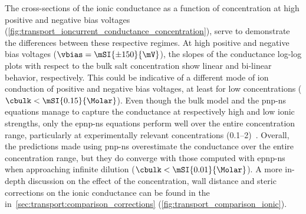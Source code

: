 The cross-sections of the ionic conductance as a function of concentration at high positive and negative bias
voltages (\cref{fig:transport_ioncurrent_conductance_concentration}), serve to demonstrate the differences
between these respective regimes. At high positive and negative bias voltages ($\vbias=\mSI{\pm150}{\mV}$),
the slopes of the conductance log-log plots with respect to the bulk salt concentration show linear and
bi-linear behavior, respectively. This could be indicative of a different mode of ion conduction of positive
and negative bias voltages, at least for low concentrations ($\cbulk<\mSI{0.15}{\Molar}$). Even though the
bulk model and the \gls{pnp-ns} equations manage to capture the conductance at respectively high and low ionic
strengths, only the \gls{epnp-ns} equations perform well over the entire concentration range, particularly at
experimentally relevant concentrations (\SIrange{0.1}{2}{\Molar})~\cite{Willems-Ruic-Biesemans-2019,
Galenkamp-2020,Franceschini-2013,Franceschini-2016}. Overall, the predictions made using \gls{pnp-ns}
overestimate the conductance over the entire concentration range, but they do converge with those computed
with \gls{epnp-ns} when approaching infinite dilution ($\cbulk<\mSI{0.01}{\Molar}$). A more in-depth
discussion on the effect of the concentration, wall distance and steric corrections on the ionic conductance
can be found in the in~\cref{sec:transport:comparison_corrections} (\cref{fig:transport_comparison_ionic}).

